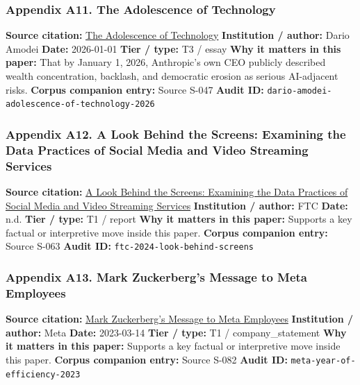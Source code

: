 \documentclass[
  american,
  11pt,
  letterpaper,
]{article}
\begin{document}
\subsubsection{Appendix A11. The Adolescence of
Technology}\label{ch-09-appendix-a11-the-adolescence-of-technology}

\textbf{Source citation:}
\href{https://darioamodei.com/essay/the-adolescence-of-technology}{The
Adolescence of Technology} \textbf{Institution / author:} Dario Amodei
\textbf{Date:} 2026-01-01 \textbf{Tier / type:} T3 / essay \textbf{Why
it matters in this paper:} That by January 1, 2026, Anthropic's own CEO
publicly described wealth concentration, backlash, and democratic
erosion as serious AI-adjacent risks. \textbf{Corpus companion entry:}
Source S-047 \textbf{Audit ID:}
\texttt{dario-amodei-adolescence-of-technology-2026}

\subsubsection{Appendix A12. A Look Behind the Screens: Examining the
Data Practices of Social Media and Video Streaming
Services}\label{ch-09-appendix-a12-a-look-behind-the-screens-examining-the-data-practices-of-social-media-and-video-streaming-services}

\textbf{Source citation:}
\href{https://www.ftc.gov/reports/look-behind-screens-examining-data-practices-social-media-video-streaming-services}{A
Look Behind the Screens: Examining the Data Practices of Social Media
and Video Streaming Services} \textbf{Institution / author:} FTC
\textbf{Date:} n.d. \textbf{Tier / type:} T1 / report \textbf{Why it
matters in this paper:} Supports a key factual or interpretive move
inside this paper. \textbf{Corpus companion entry:} Source S-063
\textbf{Audit ID:} \texttt{ftc-2024-look-behind-screens}

\subsubsection{Appendix A13. Mark Zuckerberg's Message to Meta
Employees}\label{ch-09-appendix-a13-mark-zuckerberg-s-message-to-meta-employees}

\textbf{Source citation:}
\href{https://about.fb.com/news/2023/03/mark-zuckerberg-meta-year-of-efficiency/}{Mark
Zuckerberg's Message to Meta Employees} \textbf{Institution / author:}
Meta \textbf{Date:} 2023-03-14 \textbf{Tier / type:} T1 /
company\_statement \textbf{Why it matters in this paper:} Supports a key
factual or interpretive move inside this paper. \textbf{Corpus companion
entry:} Source S-082 \textbf{Audit ID:}
\texttt{meta-year-of-efficiency-2023}
\end{document}
